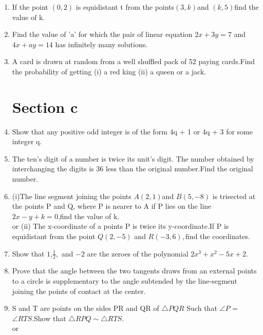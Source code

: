 \documentclass[journal,12pt,twocolumn]{IEEEtran}
\renewcommand\thesection{\arabic{section}}
\begin{document}
\begin{enumerate}[label=\thesection.\arabic*.,ref=\thesection.\theenumi]
\item If the point $(0,2)$ is equidistant
t from the points$(3,k)$and $(k,5)$find the value of k.\\

\item Find the value of 'a' for which the pair of linear equation $2x+3y=7$ and $4x+ay=14$ has infinitely many solutions.\\

\item A card is drawn at random from a well shuffled pack of 52 paying cards.Find the probability of getting (i) a red king (ii) a queen or a jack.\\

\section{Section c}
\item Show that any positive odd integer is of the form 4q + 1 or 4q + 3 for some integer q.\\

\item The ten's digit of a number is twice its unit's digit. The number obtained by interchanging the digits is 36 less than the original number.Find the original number.\\

\item (i)The line segment joining the points $A(2,1)$and $B(5,-8)$ is trisected at the points P and Q, where P is nearer to A if P lies on the line $2x-y+k=0$,find the value of k.\\or
\newline (ii) The x-coordinate of a points P is twice its y-coordinate.If P is equidistant from the point $Q(2,-5)$ and $R(-3,6),$find the coordinates.\\

\item Show that $1$,$\frac{1}{2},$ and $-2$ are the zeroes of the polynomial $2x^3+x^2-5x+2.$\\

\item Prove that the angle between the two tangents draws from an external points to a circle is supplementary to the angle subtended by the line-segment joining the points of contact at the center.\\

\item S and T are points on the sides PR and QR of $\triangle PQR $ Such that  $\angle P $ = $\angle RTS$.Show that $\triangle RPQ \sim \triangle RTS$.\\ or


\end{enumerate}
\end{document}
